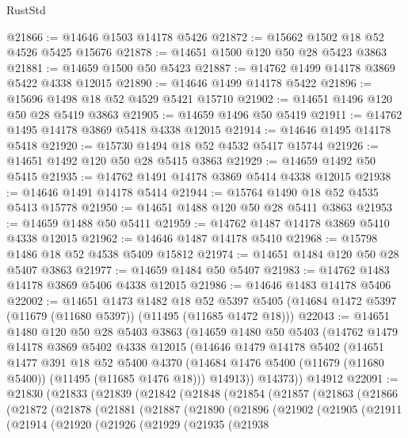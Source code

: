 \begin{lexlean}{RustStd}
\begin{coremodule}
@21866 := @14646 @1503 @14178 @5426
@21872 := @15662 @1502 @18 @52 @4526 @5425 @15676
@21878 := @14651 @1500 @120 @50 @28 @5423 @3863
@21881 := @14659 @1500 @50 @5423
@21887 := @14762 @1499 @14178 @3869 @5422 @4338 @12015
@21890 := @14646 @1499 @14178 @5422
@21896 := @15696 @1498 @18 @52 @4529 @5421 @15710
@21902 := @14651 @1496 @120 @50 @28 @5419 @3863
@21905 := @14659 @1496 @50 @5419
@21911 := @14762 @1495 @14178 @3869 @5418 @4338 @12015
@21914 := @14646 @1495 @14178 @5418
@21920 := @15730 @1494 @18 @52 @4532 @5417 @15744
@21926 := @14651 @1492 @120 @50 @28 @5415 @3863
@21929 := @14659 @1492 @50 @5415
@21935 := @14762 @1491 @14178 @3869 @5414 @4338 @12015
@21938 := @14646 @1491 @14178 @5414
@21944 := @15764 @1490 @18 @52 @4535 @5413 @15778
@21950 := @14651 @1488 @120 @50 @28 @5411 @3863
@21953 := @14659 @1488 @50 @5411
@21959 := @14762 @1487 @14178 @3869 @5410 @4338 @12015
@21962 := @14646 @1487 @14178 @5410
@21968 := @15798 @1486 @18 @52 @4538 @5409 @15812
@21974 := @14651 @1484 @120 @50 @28 @5407 @3863
@21977 := @14659 @1484 @50 @5407
@21983 := @14762 @1483 @14178 @3869 @5406 @4338 @12015
@21986 := @14646 @1483 @14178 @5406
@22002 := @14651
    @1473
    @1482
    @18
    @52
    @5397
    @5405
    (@14684 @1472 @5397 (@11679 (@11680 @5397)) (@11495 (@11685 @1472 @18)))
@22043 := @14651
    @1480
    @120
    @50
    @28
    @5403
    @3863
    (@14659
      @1480
      @50
      @5403
      (@14762
        @1479
        @14178
        @3869
        @5402
        @4338
        @12015
        (@14646
          @1479
          @14178
          @5402
          (@14651
            @1477
            @391
            @18
            @52
            @5400
            @4370
            (@14684 @1476 @5400 (@11679 (@11680 @5400)) (@11495 (@11685 @1476 @18)))
            @14913))
        @14373))
    @14912
@22091 := @21830
    (@21833
      (@21839
        (@21842
          (@21848
            (@21854
              (@21857
                (@21863
                  (@21866
                    (@21872
                      (@21878
                        (@21881
                          (@21887
                            (@21890
                              (@21896
                                (@21902
                                  (@21905
                                    (@21911
                                      (@21914
                                        (@21920
                                          (@21926
                                            (@21929
                                              (@21935
                                                (@21938

\end{coremodule}
\end{lexlean}
